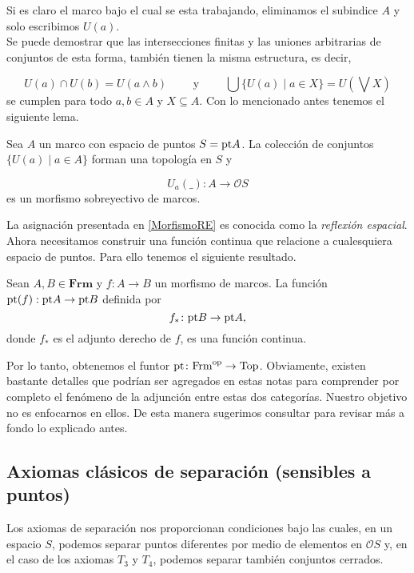\documentclass{comunicaciones}
\begin{document}
Si es claro el marco bajo el cual se esta trabajando, eliminamos el subindice $A$ y solo escribimos $U(a)$.\\

Se puede demostrar que las intersecciones finitas y las uniones arbitrarias de conjuntos de esta forma, también tienen la misma estructura, es decir,

\[
U(a)\cap U(b)=U(a\wedge b)\qquad\mbox{ y }\qquad\bigcup\{U(a)\mid a\in X\}=U\left(\bigvee X\right)
\]
se cumplen para todo $a, b\in A$ y $X\subseteq A$. Con lo mencionado antes tenemos el siguiente lema.

\begin{lem}\label{ReflexionEspacial}
    Sea $A$ un marco con espacio de puntos $S=\mathrm{pt} A$. La colección de conjuntos $\{U(a)\mid a\in A\}$ forman una topología en $S$ y 

    \begin{equation}\label{MorfismoRE}
            U_a(\_)\colon A\to \mathcal{O}S
    \end{equation}
    es un morfismo sobreyectivo de marcos.
\end{lem}
La asignación presentada en \ref{MorfismoRE} es conocida como la \emph{reflexión espacial}. Ahora necesitamos construir una función continua que relacione a cualesquiera espacio de puntos. Para ello tenemos el siguiente resultado.

\begin{lem}
    Sean $A,B\in\mathbf{Frm}$ y $f\colon A\to B$ un morfismo de marcos. La función $\mathrm{pt}(f):\mathrm{pt} A\to \mathrm{pt} B$ definida por 
    \[
    f_*\colon \mathrm{pt} B\to \mathrm{pt} A,
    \]
    donde $f_*$ es el adjunto derecho de $f$, es una función continua.
    \end{lem}

Por lo tanto, obtenemos el funtor $\mathrm{pt}\colon \mathrm{Frm}^{\mathrm{op}}\to \mathrm{Top}$. Obviamente, existen bastante detalles que podrían ser agregados en estas notas para comprender por completo el fenómeno de la adjunción entre estas dos categorías. Nuestro objetivo no es enfocarnos en ellos. De esta manera sugerimos consultar \cite{A.Z.} para revisar más a fondo lo explicado antes. 

\subsection{Axiomas clásicos de separación (sensibles a puntos)}
Los axiomas de separación nos proporcionan condiciones bajo las cuales, en un espacio $S$, podemos separar puntos diferentes por medio de elementos en $\mathcal{O}S$ y, en el caso de los axiomas $T_3$ y $T_4$, podemos separar también conjuntos cerrados.\\
\end{document}
